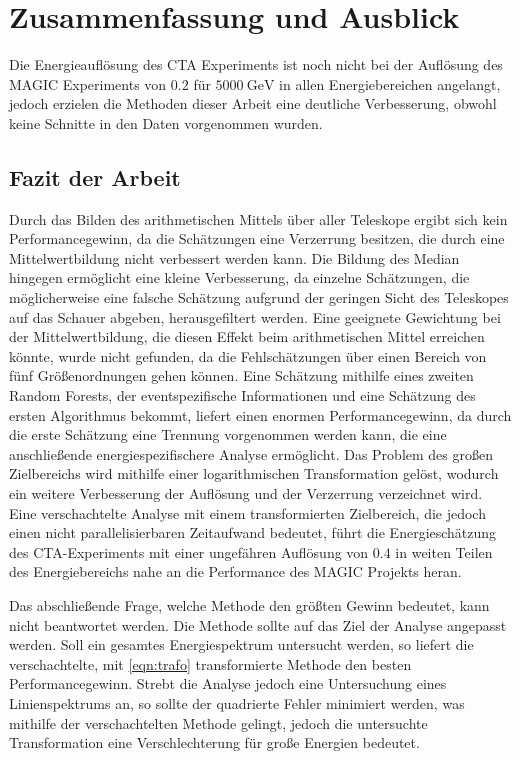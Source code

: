 \chapter{Zusammenfassung und Ausblick}
Die Energieauflösung des CTA Experiments ist noch nicht bei der Auflösung des MAGIC Experiments von $\num{0.2}$ für
$\SI{5000}{\giga\eV}$\cite{MAGIC_performance} in allen Energiebereichen angelangt, jedoch erzielen die Methoden dieser
Arbeit eine deutliche Verbesserung, obwohl keine Schnitte in den Daten vorgenommen wurden.


\section{Fazit der Arbeit}

Durch das Bilden des arithmetischen Mittels über aller Teleskope ergibt sich kein Performancegewinn, da die Schätzungen
eine Verzerrung besitzen, die durch eine Mittelwertbildung nicht verbessert werden kann.
Die Bildung des Median hingegen ermöglicht eine kleine Verbesserung, da einzelne Schätzungen, die möglicherweise
eine falsche Schätzung aufgrund der geringen Sicht des Teleskopes auf das Schauer abgeben, herausgefiltert werden.
Eine geeignete Gewichtung bei der Mittelwertbildung, die diesen Effekt beim arithmetischen Mittel erreichen könnte, wurde
nicht gefunden, da die Fehlschätzungen über einen Bereich von fünf Größenordnungen gehen können.
Eine Schätzung mithilfe eines zweiten Random Forests, der eventspezifische Informationen und eine
Schätzung des ersten Algorithmus bekommt, liefert einen enormen Performancegewinn, da durch die erste Schätzung eine
Trennung vorgenommen werden kann, die eine anschließende energiespezifischere Analyse ermöglicht.
Das Problem des großen Zielbereichs wird mithilfe einer logarithmischen Transformation gelöst, wodurch ein weitere
Verbesserung der Auflösung und der Verzerrung verzeichnet wird.
Eine verschachtelte Analyse mit einem transformierten Zielbereich, die jedoch einen nicht parallelisierbaren Zeitaufwand bedeutet,
führt die Energieschätzung des CTA-Experiments mit einer ungefähren Auflösung von $0.4$ in weiten Teilen des
Energiebereichs nahe an die Performance des MAGIC Projekts heran.

Das abschließende Frage, welche Methode den größten Gewinn bedeutet, kann nicht beantwortet werden.
Die Methode sollte auf das Ziel der Analyse angepasst werden.
Soll ein gesamtes Energiespektrum untersucht werden, so liefert die verschachtelte, mit \eqref{eqn:trafo} transformierte Methode
den besten Performancegewinn.
Strebt die Analyse jedoch eine Untersuchung eines Linienspektrums an, so sollte der quadrierte Fehler minimiert werden, was mithilfe
der verschachtelten Methode gelingt, jedoch die untersuchte Transformation eine Verschlechterung für große Energien bedeutet.

